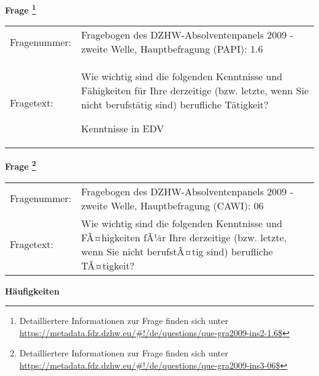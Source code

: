 				\vspace*{0.5cm}
                \noindent\textbf{Frage
	                \footnote{Detailliertere Informationen zur Frage finden sich unter
		              \url{https://metadata.fdz.dzhw.eu/\#!/de/questions/que-gra2009-ins2-1.6$}}}\\
				\begin{tabularx}{\hsize}{@{}lX}
					Fragenummer: &
					  Fragebogen des DZHW-Absolventenpanels 2009 - zweite Welle, Hauptbefragung (PAPI):
					  1.6
 \\
					Fragetext: & Wie wichtig sind die folgenden Kenntnisse und Fähigkeiten für Ihre derzeitige (bzw. letzte, wenn Sie nicht berufstätig sind) berufliche Tätigkeit?\par  Kenntnisse in EDV \\
				\end{tabularx}
				\vspace*{0.5cm}
                \noindent\textbf{Frage
	                \footnote{Detailliertere Informationen zur Frage finden sich unter
		              \url{https://metadata.fdz.dzhw.eu/\#!/de/questions/que-gra2009-ins3-06$}}}\\
				\begin{tabularx}{\hsize}{@{}lX}
					Fragenummer: &
					  Fragebogen des DZHW-Absolventenpanels 2009 - zweite Welle, Hauptbefragung (CAWI):
					  06
 \\
					Fragetext: & Wie wichtig sind die folgenden Kenntnisse und FÃ¤higkeiten fÃ¼r Ihre derzeitige (bzw. letzte, wenn Sie nicht berufstÃ¤tig sind) berufliche TÃ¤tigkeit? \\
				\end{tabularx}





        		\vspace*{0.5cm}
                \noindent\textbf{Häufigkeiten}

